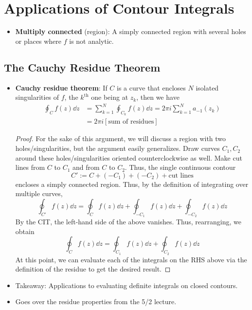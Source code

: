 \documentclass[../finalProject.tex]{subfiles}
\begin{document}
\section{Applications of Contour Integrals}\label{sch:8}
\begin{itemize}
    \item {}\textbf{Multiply connected} (region): A simply connected region with several holes or places where $f$ is not analytic.
\end{itemize}
\subsection{The Cauchy Residue Theorem}
\begin{itemize}
    \item \textbf{Cauchy residue theorem}: If $C$ is a curve that encloses $N$ isolated singularities of $f$, the $k^\text{th}$ one being at $z_k$, then we have
    \begin{align*}
        \oint_Cf(z)\dd{z} &= \sum_{k=1}^N\oint_{C_k}f(z)\dd{z}
            = 2\pi i\sum_{k=1}^Na_{-1}(z_k)\\
        &= 2\pi i[\text{sum of residues}]
    \end{align*}
    \begin{proof}
        For the sake of this argument, we will discuss a region with two holes/singularities, but the argument easily generalizes. Draw curves $C_1,C_2$ around these holes/singularities oriented counterclockwise as well. Make cut lines from $C$ to $C_1$ and from $C$ to $C_2$. Thus, the single continuous contour
        \begin{equation*}
            C' := C+(-C_1)+(-C_2)+\text{cut lines}
        \end{equation*}
        encloses a simply connected region. Thus, by the definition of integrating over multiple curves,
        \begin{equation*}
            \oint_{C'}f(z)\dd{z} = \oint_Cf(z)\dd{z}+\oint_{-C_1}f(z)\dd{z}+\oint_{-C_2}f(z)\dd{z}
        \end{equation*}
        By the CIT, the left-hand side of the above vanishes. Thus, rearranging, we obtain
        \begin{equation*}
            \oint_Cf(z)\dd{z} = \oint_{C_1}f(z)\dd{z}+\oint_{C_2}f(z)\dd{z}
        \end{equation*}
        At this point, we can evaluate each of the integrals on the RHS above via the definition of the residue to get the desired result.
    \end{proof}
    \item Takeaway: Applications to evaluating definite integrals on closed contours.
    \item Goes over the residue properties from the 5/2 lecture.
\end{itemize}
\end{document}
